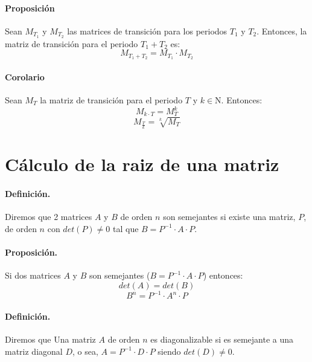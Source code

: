\paragraph{Proposici\'on} Sean $M_{T_1}$ y $M_{T_2}$ las matrices de transici\'on
para los periodos $T_1$ y $T_2$. Entonces, la matriz de transici\'on para el
periodo $T_1+T_2$ es:
\begin{displaymath}
M_{T_1+T_2} = M_{T_1} \cdot M_{T_2}
\end{displaymath}

\paragraph{Corolario} Sean $M_{T}$ la matriz de transici\'on para el periodo 
$T$ y $k \in \mathrm{N}$. Entonces:
\begin{displaymath}
M_{k \cdot T} = M_{T}^k
\end{displaymath}
\begin{displaymath}
M_{\frac{T}{k}} = \sqrt[k]{M_{T}}
\end{displaymath}



\section{C\'alculo de la raiz de una matriz}

\paragraph{Definici\'on.}
Diremos que 2 matrices $A$ y $B$ de orden $n$ son semejantes si existe una 
matriz, $P$, de orden $n$ con $det(P) \neq 0$ tal que 
$B = P^{-1} \cdot A \cdot P$.


\paragraph{Proposici\'on.} Si dos matrices $A$ y $B$ son semejantes 
($B = P^{-1} \cdot A \cdot P$) entonces:
\begin{displaymath}
det(A) = det(B)
\end{displaymath}
\begin{displaymath}
B^n = P^{-1} \cdot A^{n} \cdot P
\end{displaymath}

\paragraph{Definici\'on.} 
Diremos que Una matriz $A$ de orden $n$ es diagonalizable si es semejante a una 
matriz diagonal $D$, o sea, $A = P^{-1} \cdot D \cdot P$ siendo $det(D) \neq 0$.

